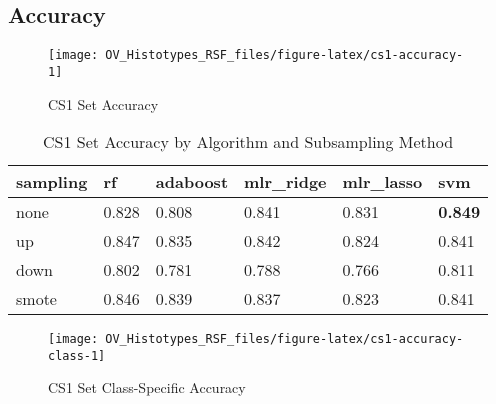 \documentclass[
]{report}
\begin{document}
\hypertarget{accuracy-1}{%
\subsection{Accuracy}\label{accuracy-1}}

\begin{figure}[H]

{\centering \texttt{[image: OV\_Histotypes\_RSF\_files/figure-latex/cs1-accuracy-1]} 

}

\caption{CS1 Set Accuracy}\label{fig:cs1-accuracy}
\end{figure}

\begin{table}

\caption{\label{tab:cs1-accuracy-table}CS1 Set Accuracy by Algorithm and Subsampling Method}
\centering
\begin{tabular}[t]{l|l|l|l|l|l}
\hline
sampling & rf & adaboost & mlr\_ridge & mlr\_lasso & svm\\
\hline
none & 0.828 & 0.808 & 0.841 & 0.831 & \textbf{0.849}\\
\hline
up & 0.847 & 0.835 & 0.842 & 0.824 & 0.841\\
\hline
down & 0.802 & 0.781 & 0.788 & 0.766 & 0.811\\
\hline
smote & 0.846 & 0.839 & 0.837 & 0.823 & 0.841\\
\hline
\end{tabular}
\end{table}

\begin{figure}[H]

{\centering \texttt{[image: OV\_Histotypes\_RSF\_files/figure-latex/cs1-accuracy-class-1]} 

}

\caption{CS1 Set Class-Specific Accuracy}\label{fig:cs1-accuracy-class}
\end{figure}
\end{document}
